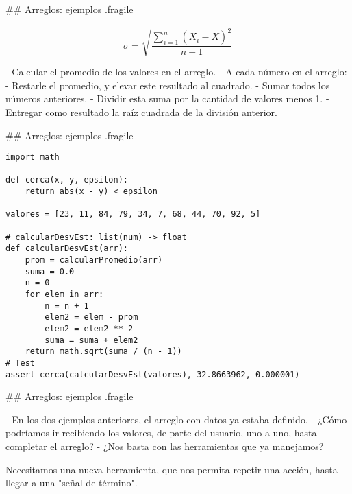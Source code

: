 ## Arreglos: ejemplos {.fragile}


\bgnblocknormal[centered,wd=.7\textwidth]
\footnotesize
\vspace{-3ex}
$$ \sigma = \sqrt{\frac{\sum^n_{i=1}{(X_i - \bar{X})}^2}{n-1}} $$
\vspace{-2ex}
\trmblocknormal

- Calcular el promedio de los valores en el arreglo.
- A cada número en el arreglo:
    - Restarle el promedio, y elevar este resultado al cuadrado.
    - Sumar todos los números anteriores.
- Dividir esta suma por la cantidad de valores menos 1.
- Entregar como resultado la raíz cuadrada de la división anterior.

## Arreglos: ejemplos {.fragile}


\begin{lstlisting}[style=frame03]
import math

def cerca(x, y, epsilon):
    return abs(x - y) < epsilon

valores = [23, 11, 84, 79, 34, 7, 68, 44, 70, 92, 5]

# calcularDesvEst: list(num) -> float
def calcularDesvEst(arr):
    prom = calcularPromedio(arr)
    suma = 0.0
    n = 0
    for elem in arr:
        n = n + 1
        elem2 = elem - prom
        elem2 = elem2 ** 2
        suma = suma + elem2
    return math.sqrt(suma / (n - 1))
# Test
assert cerca(calcularDesvEst(valores), 32.8663962, 0.000001)
\end{lstlisting}

## Arreglos: ejemplos {.fragile}

- En los dos ejemplos anteriores, el arreglo con datos ya estaba definido.
- ¿Cómo podríamos ir recibiendo los valores, de parte del usuario, uno a uno, hasta
completar el arreglo?
    - ¿Nos basta con las herramientas que ya manejamos?

\pause

\bgnblockdanger
Necesitamos una nueva herramienta, que nos permita repetir una acción, hasta
llegar a una "señal de término".
\trmblockdanger

